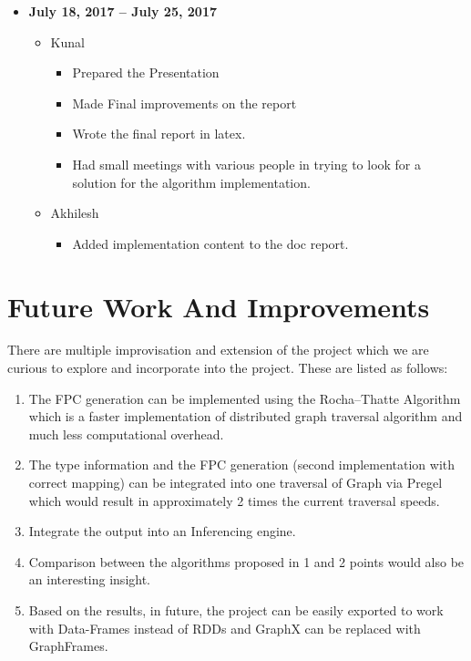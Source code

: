 \documentclass{easychair}
\begin{document}
\begin{itemize}
\begin{itemize}
    \end{itemize}
   \item \textbf{July 18, 2017 – July 25, 2017}
    \begin{itemize}
    \item Kunal 
    \begin{itemize}
    \item Prepared the Presentation
\item  Made Final improvements on the report
\item  Wrote the final report in latex.
\item  Had small meetings with various people in trying to look for a solution for the algorithm implementation. 

 \end{itemize}
 \item Akhilesh
  \begin{itemize}
   \item Added implementation content to the doc report.
 \end{itemize}
     \end{itemize}
\end{itemize}


\section{Future Work And Improvements}
There are multiple improvisation and extension of the project which we are curious to explore and incorporate into the project. These  are listed as follows:

\begin{enumerate}
\item The FPC generation can be implemented using the Rocha–Thatte Algorithm which is a faster implementation of distributed graph traversal algorithm and much less computational overhead. 
\item The type information and the FPC generation (second implementation with correct mapping) can be integrated into one traversal of Graph via Pregel which would result in approximately 2 times the current traversal speeds. 
\item Integrate the output into an Inferencing engine. 
\item Comparison between the algorithms proposed in 1 and 2 points would also be an interesting insight. 
\item Based on the results, in future, the project can be easily exported to work with Data-Frames instead of RDDs and GraphX can be replaced with GraphFrames\cite{graphframes}. 

\end{enumerate}
\end{document}
